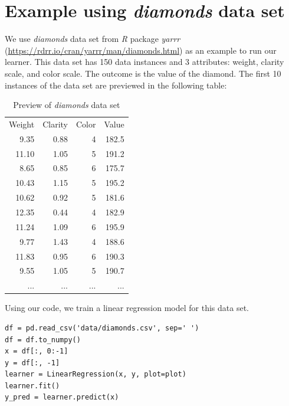 \documentclass[
	letterpaper
]{article}
\begin{document}
\section{Example using \textit{diamonds} data set}
We use \textit{diamonds} data set from \textit{R} package \textit{yarrr} (\url{https://rdrr.io/cran/yarrr/man/diamonds.html}) as an example to run our learner.
This data set has 150 data instances and 3 attributes: weight, clarity scale, and color scale.
The outcome is the value of the diamond.
The first 10 instances of the data set are previewed in the following table:
\begin{table}[htbp]
	\small 
	\centering 
		\caption{Preview of \textit{diamonds} data set}
		\label{table:diamonds}
	\begin{tabular}{r r r|r}
		Weight & Clarity & Color & Value \\
9.35	&		0.88	&		4		&	  182.5\\
11.10	&   1.05	&		5		&  191.2\\
8.65	&		0.85	&		6		&  175.7\\
10.43	&		1.15	& 	5		&  195.2\\
10.62	&		0.92	&		5		&  181.6\\
12.35	&		0.44	&		4		&  182.9\\
11.24	&		1.09	& 	6		&  195.9\\
9.77	&		1.43	&		4		&  188.6\\
11.83	& 	0.95	&		6		&  190.3\\
9.55	&		1.05	&		5		&  190.7\\
...	&		...	&		...		&  ...\\
	\end{tabular}
 \end{table}
 
Using our code, we train a linear regression model for this data set.
\begin{lstlisting}
df = pd.read_csv('data/diamonds.csv', sep=' ')
df = df.to_numpy()
x = df[:, 0:-1]
y = df[:, -1]
learner = LinearRegression(x, y, plot=plot)
learner.fit()
y_pred = learner.predict(x)
\end{lstlisting}
\end{document}
